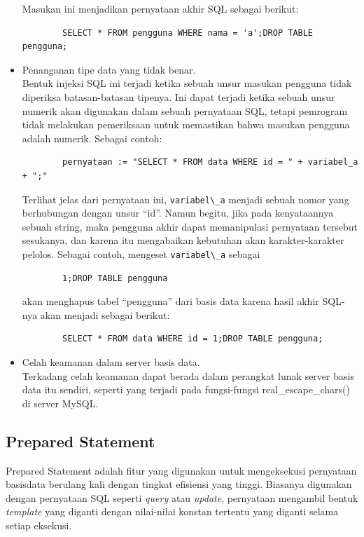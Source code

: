 \begin{itemize}
	Masukan ini menjadikan pernyataan akhir SQL sebagai berikut:

	\begin{lstlisting}
		SELECT * FROM pengguna WHERE nama = 'a';DROP TABLE pengguna; 
	\end{lstlisting}
	\item Penanganan tipe data yang tidak benar.\\
	Bentuk injeksi SQL ini terjadi ketika sebuah unsur masukan pengguna tidak diperiksa batasan-batasan tipenya. Ini dapat terjadi ketika sebuah unsur numerik akan digunakan dalam sebuah pernyataan SQL, tetapi pemrogram tidak melakukan pemeriksaan untuk memastikan bahwa masukan pengguna adalah numerik. Sebagai contoh:
	
	\begin{lstlisting}
		pernyataan := "SELECT * FROM data WHERE id = " + variabel_a + ";"
	\end{lstlisting}
	
	Terlihat jelas dari pernyataan ini, \verb!variabel\_a! menjadi sebuah nomor yang berhubungan dengan unsur ``id''. Namun begitu, jika pada kenyataannya sebuah string, maka pengguna akhir dapat memanipulasi pernyataan tersebut sesukanya, dan karena itu mengabaikan kebutuhan akan karakter-karakter pelolos. Sebagai contoh, mengeset \verb!variabel\_a! sebagai

	\begin{lstlisting}
		1;DROP TABLE pengguna
	\end{lstlisting}
	akan menghapus tabel ``pengguna'' dari basis data karena hasil akhir SQL-nya akan menjadi sebagai berikut:
	\begin{lstlisting}
		SELECT * FROM data WHERE id = 1;DROP TABLE pengguna;
	\end{lstlisting}
	
	\item Celah keamanan dalam server basis data.\\
	Terkadang celah keamanan dapat berada dalam perangkat lunak server basis data itu sendiri, seperti yang terjadi pada fungsi-fungsi real\_escape\_chars() di server MySQL.
\end{itemize}

\subsection{Prepared Statement}
Prepared Statement adalah fitur yang digunakan untuk mengeksekusi pernyataan basisdata berulang kali dengan tingkat efisiensi yang tinggi.  Biasanya digunakan dengan pernyataan SQL seperti \textit{query} atau \textit{update}, pernyataan mengambil bentuk \textit{template} yang diganti dengan nilai-nilai konstan tertentu yang diganti selama setiap eksekusi.

